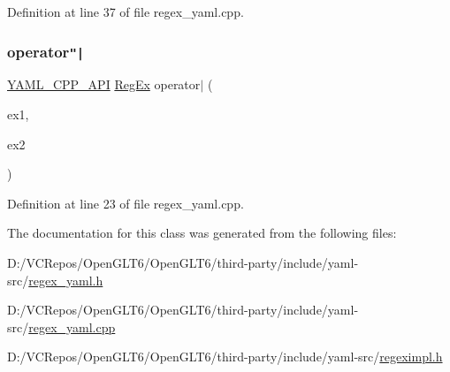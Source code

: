 Definition at line 37 of file regex\+\_\+yaml.\+cpp.

\mbox{\label{class_y_a_m_l_1_1_reg_ex_a87db818e0bd5370f811f3fc3ba1ddbc5}} 
\subsubsection{\texorpdfstring{operator\texttt{"|}}{operator|}}
{\footnotesize\ttfamily \mbox{\hyperlink{dll_8h_a70903db05b58f40db9aa4f966658fa65}{Y\+A\+M\+L\+\_\+\+C\+P\+P\+\_\+\+A\+PI}} \mbox{\hyperlink{class_y_a_m_l_1_1_reg_ex}{Reg\+Ex}} operator$\vert$ (\begin{DoxyParamCaption}\item[{const \mbox{\hyperlink{class_y_a_m_l_1_1_reg_ex}{Reg\+Ex}} \&}]{ex1,  }\item[{const \mbox{\hyperlink{class_y_a_m_l_1_1_reg_ex}{Reg\+Ex}} \&}]{ex2 }\end{DoxyParamCaption})\hspace{0.3cm}{\ttfamily [friend]}}



Definition at line 23 of file regex\+\_\+yaml.\+cpp.



The documentation for this class was generated from the following files\+:\begin{DoxyCompactItemize}
\item 
D\+:/\+V\+C\+Repos/\+Open\+G\+L\+T6/\+Open\+G\+L\+T6/third-\/party/include/yaml-\/src/\mbox{\hyperlink{regex__yaml_8h}{regex\+\_\+yaml.\+h}}\item 
D\+:/\+V\+C\+Repos/\+Open\+G\+L\+T6/\+Open\+G\+L\+T6/third-\/party/include/yaml-\/src/\mbox{\hyperlink{regex__yaml_8cpp}{regex\+\_\+yaml.\+cpp}}\item 
D\+:/\+V\+C\+Repos/\+Open\+G\+L\+T6/\+Open\+G\+L\+T6/third-\/party/include/yaml-\/src/\mbox{\hyperlink{regeximpl_8h}{regeximpl.\+h}}\end{DoxyCompactItemize}

